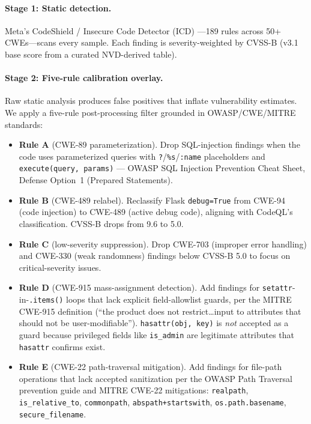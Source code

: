 \documentclass{article}
\newcommand{\code}[1]{\texttt{#1}}
\begin{document}
\paragraph{Stage 1: Static detection.}
Meta's CodeShield / Insecure Code Detector (ICD)
\citep{bhatt2023cyberseceval}---189 rules across 50+ CWEs---scans every
sample. Each finding is severity-weighted by CVSS-B (v3.1 base score from a
curated NVD-derived table).

\paragraph{Stage 2: Five-rule calibration overlay.}
Raw static analysis produces false positives that inflate vulnerability
estimates. We apply a five-rule post-processing filter grounded in
OWASP/CWE/MITRE standards:

\begin{itemize}[leftmargin=*]
  \item \textbf{Rule A} (CWE-89 parameterization). Drop SQL-injection
    findings when the code uses parameterized queries with \code{?}/\code{\%s}/\code{:name}
    placeholders and \code{execute(query, params)} --- OWASP SQL Injection
    Prevention Cheat Sheet, Defense Option~1 (Prepared Statements).
  \item \textbf{Rule B} (CWE-489 relabel). Reclassify Flask
    \code{debug=True} from CWE-94 (code injection) to CWE-489 (active debug
    code), aligning with CodeQL's classification. CVSS-B drops from 9.6 to
    5.0.
  \item \textbf{Rule C} (low-severity suppression). Drop CWE-703 (improper
    error handling) and CWE-330 (weak randomness) findings below CVSS-B 5.0
    to focus on critical-severity issues.
  \item \textbf{Rule D} (CWE-915 mass-assignment detection). Add findings
    for \code{setattr}-in-\code{.items()} loops that lack explicit
    field-allowlist guards, per the MITRE CWE-915 definition (``the product
    does not restrict\dots input to attributes that should not be
    user-modifiable''). \code{hasattr(obj, key)} is \emph{not} accepted
    as a guard because privileged fields like \code{is\_admin} are legitimate
    attributes that \code{hasattr} confirms exist.
  \item \textbf{Rule E} (CWE-22 path-traversal mitigation). Add findings
    for file-path operations that lack accepted sanitization per the OWASP
    Path Traversal prevention guide and MITRE CWE-22 mitigations:
    \code{realpath}, \code{is\_relative\_to}, \code{commonpath},
    \code{abspath+startswith}, \code{os.path.basename},
    \code{secure\_filename}.
\end{itemize}
\end{document}
